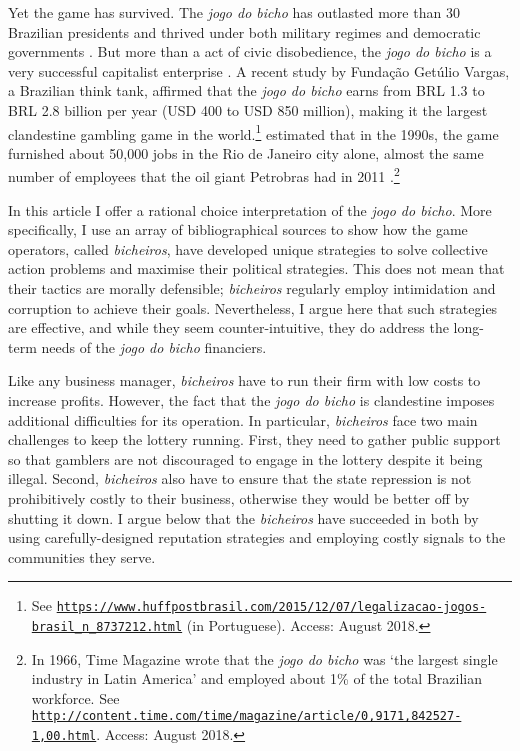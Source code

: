 \documentclass[a4paper,12pt]{article}
\begin{document}
Yet the game has survived. The \textit{jogo do bicho} has outlasted more than 30 Brazilian presidents and thrived under both military regimes and democratic governments \citep{jupiara2015poroes}. But more than a act of civic disobedience, the \textit{jogo do bicho} is a very successful capitalist enterprise \citep{labronici2014sorteio, magalhaes2005ganhou}. A recent study by Fundação Getúlio Vargas, a Brazilian think tank, affirmed that the \textit{jogo do bicho} earns from BRL 1.3 to BRL 2.8 billion per year (USD 400 to USD 850 million), making it the largest clandestine gambling game in the world.\footnote{See \href{https://www.huffpostbrasil.com/2015/12/07/legalizacao-jogos-brasil_n_8737212.html}{\texttt{https://www.huffpostbrasil.com/2015/12/07/legalizacao-jogos-brasil\_n\_8737212.html}} (in Portuguese). Access: August 2018.} \citet[171]{schneider1996brazil} estimated that in the 1990s, the game furnished about 50,000 jobs in the Rio de Janeiro city alone, almost the same number of employees that the oil giant Petrobras had in 2011 \citep{exame2013petrobras}.\footnote{In 1966, Time Magazine wrote that the \textit{jogo do bicho} was `the largest single industry in Latin America' and employed about 1\% of the total Brazilian workforce. See \href{http://content.time.com/time/magazine/article/0,9171,842527-1,00.html}{\texttt{http://content.time.com/time/magazine/article/0,9171,842527-1,00.html}}. Access: August 2018.}

In this article I offer a rational choice interpretation of the \textit{jogo do bicho}. More specifically, I use an array of bibliographical sources to show how the game operators, called \textit{bicheiros}, have developed unique strategies to solve collective action problems and maximise their political strategies. This does not mean that their tactics are morally defensible; \textit{bicheiros} regularly employ intimidation and corruption to achieve their goals. Nevertheless, I argue here that such strategies are effective, and while they seem counter-intuitive, they do address the long-term needs of the \textit{jogo do bicho} financiers. 

Like any business manager, \textit{bicheiros} have to run their firm with low costs to increase profits. However, the fact that the \textit{jogo do bicho} is clandestine imposes additional difficulties for its operation. In particular,  \textit{bicheiros} face two main challenges to keep the lottery running. First, they need to gather public support so that gamblers are not discouraged to engage in the lottery despite it being illegal. Second, \textit{bicheiros} also have to ensure that the state repression is not prohibitively costly to their business, otherwise they would be better off by shutting it down. I argue below that the \textit{bicheiros} have succeeded in both by using carefully-designed reputation strategies and employing costly signals to the communities they serve. 
\end{document}
